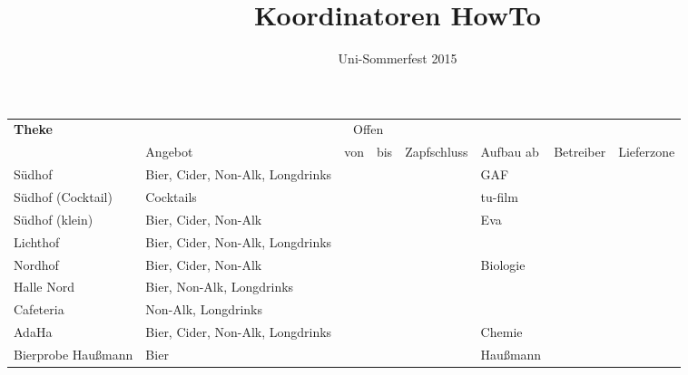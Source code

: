 \documentclass[a4paper]{article}
\title{Koordinatoren HowTo}
\author{Uni-Sommerfest 2015}
\date{}
\begin{document}
\maketitle
{}
\begin{tabular}{p{2cm}p{2cm}llllll}
  \multirow{2}{*}{\textbf{Theke}} & & \multicolumn{2}{c}{Offen} & & & & \\
  & Angebot & von & bis & Zapfschluss & Aufbau ab & Betreiber & Lieferzone \\
  Südhof & Bier, Cider, Non-Alk, Longdrinks & & & & GAF & \\
  Südhof (Cocktail) & Cocktails & & & & tu-film & \\
  Südhof (klein) & Bier, Cider, Non-Alk & & & & Eva & \\
  Lichthof & Bier, Cider, Non-Alk, Longdrinks & & & & & \\
  Nordhof & Bier, Cider, Non-Alk & & & & Biologie & \\
  Halle Nord & Bier, Non-Alk, Longdrinks & & & & & \\
  Cafeteria & Non-Alk, Longdrinks & & & & & \\
  AdaHa & Bier, Cider, Non-Alk, Longdrinks & & & & Chemie & \\
  Bierprobe Haußmann & Bier & & & & Haußmann &
\end{tabular}
\end{document}
